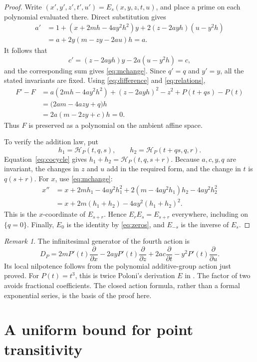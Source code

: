 \documentclass[11pt,letterpaper]{article}
\newcommand{\dd}{\mathcal H}
\theoremstyle{remark}
\newtheorem{remark}[theorem]{Remark}
\begin{document}
\begin{proof}
Write $(x',y',z',t',u')=E_s(x,y,z,t,u)$, and place a prime on each polynomial evaluated there. Direct substitution gives
\begin{align*}
a'
&=1+(x+2mh-4ay^2h^2)y
       +2(z-2ayh)(u-y^2h)\\
&=a+2y(m-zy-2au)h=a.
\end{align*}
It follows that
\[
c'=(z-2ayh)y-2a(u-y^2h)=c,
\]
and the corresponding sum gives \eqref{eq:mchange}. Since $q'=q$ and $y'=y$, all the stated invariants are fixed. Using \eqref{eq:difference} and \eqref{eq:relations},
\begin{align*}
F'-F
&=a(2mh-4ay^2h^2)
 +(z-2ayh)^2-z^2+P(t+qs)-P(t)\\
&=\bigl(2am-4azy+q\bigr)h\\
&=2a(m-2zy+c)h=0.
\end{align*}
Thus $F$ is preserved as a polynomial on the ambient affine space.

To verify the addition law, put
\[
h_1=\dd_P(t,q,s),\qquad h_2=\dd_P(t+qs,q,r).
\]
Equation~\eqref{eq:cocycle} gives $h_1+h_2=\dd_P(t,q,s+r)$. Because $a,c,y,q$ are invariant, the changes in $z$ and $u$ add in the required form, and the change in $t$ is $q(s+r)$. For $x$, use \eqref{eq:mchange}:
\begin{align*}
x''
&=x+2mh_1-4ay^2h_1^2
   +2(m-4ay^2h_1)h_2-4ay^2h_2^2\\
&=x+2m(h_1+h_2)-4ay^2(h_1+h_2)^2.
\end{align*}
This is the $x$-coordinate of $E_{s+r}$. Hence $E_rE_s=E_{s+r}$ everywhere, including on $\{q=0\}$. Finally, $E_0$ is the identity by \eqref{eq:zeros}, and $E_{-s}$ is the inverse of $E_s$.
\end{proof}

\begin{remark}\label{rem:generator}
The infinitesimal generator of the fourth action is
\[
D_P=2mP'(t)\frac{\partial}{\partial x}
     -2ayP'(t)\frac{\partial}{\partial z}
     +2ac\frac{\partial}{\partial t}
     -y^2P'(t)\frac{\partial}{\partial u}.
\]
Its local nilpotence follows from the polynomial additive-group action just proved. For $P(t)=t^3$, this is twice Poloni's derivation $E$ in \cite{Poloni}. The factor of two avoids fractional coefficients. The closed action formula, rather than a formal exponential series, is the basis of the proof here.
\end{remark}

\section{A uniform bound for point transitivity}\label{sec:transitivity}
\end{document}
